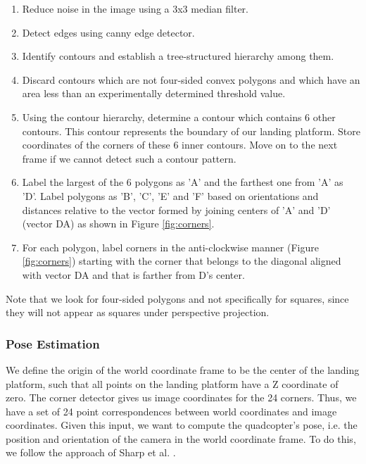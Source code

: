 \documentclass[10pt]{scrartcl} %
\begin{document}
\begin{enumerate}
\item{Reduce noise in the image using a 3x3 median filter.}
\item{Detect edges using canny edge detector.}
\item{Identify contours and establish a tree-structured hierarchy among them.}
\item{Discard contours which are not four-sided convex polygons and which have an area
	less than an experimentally determined threshold value.}
\item{Using the contour hierarchy, determine a contour which contains 6 other contours.
	This contour represents the boundary of our landing platform. Store coordinates of
	the corners of these 6 inner contours. Move on to the next frame if we cannot detect 
	such a contour pattern.}
\item{Label the largest of the 6 polygons as 'A' and the farthest one from 'A' as 'D'.
	Label polygons as 'B', 'C', 'E' and 'F' based on orientations and distances relative
	to the vector formed by joining centers of 'A' and 'D' (vector DA) as shown in 
	Figure \ref{fig:corners}.}
\item{For each polygon, label corners in the anti-clockwise manner (Figure \ref{fig:corners})
	starting with the corner that belongs to the diagonal aligned with vector DA and that is 
	farther from D's center.}
\end{enumerate}

Note that we look for four-sided polygons and not specifically for squares, since they
will not appear as squares under perspective projection.

\subsubsection{Pose Estimation}

We define the origin of the world coordinate frame to be the center of the
landing platform, such that all points on the landing platform have a Z
coordinate of zero. The corner detector gives us image coordinates for the 24
corners. Thus, we have a set of 24 point correspondences between world
coordinates and image coordinates. Given this input, we want to compute the
quadcopter's pose, i.e. the position and orientation of the camera in the world
coordinate frame. To do this, we follow the approach of Sharp et al.
\cite{sharp_et_al_2001}.

\end{document}
